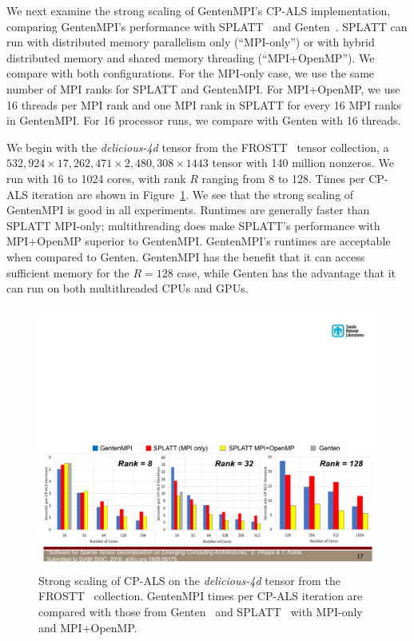 We next examine the strong scaling of GentenMPI's CP-ALS implementation,
comparing GentenMPI's performance with SPLATT~\cite{SK16} and 
Genten~\cite{PK19}.
SPLATT can run with distributed memory parallelism only (``MPI-only'') or
with hybrid distributed memory and shared memory threading (``MPI+OpenMP'').
We compare with both configurations.  
For the MPI-only case, we use the same number of 
MPI ranks for SPLATT and GentenMPI.  For MPI+OpenMP, we use 16 threads per 
MPI rank and one MPI rank in SPLATT for every 16 MPI ranks in GentenMPI.
For 16 processor runs, we compare with Genten with 16 threads.

We begin with the \emph{delicious-4d} tensor from the FROSTT~\cite{FROSTT} 
tensor collection,
a $532,924 \times 17,262,471 \times 2,480,308 \times 1443$ tensor with 140 million
nonzeros.
We run with 16 to 1024 cores, with rank $R$ ranging from 8 to 128.
Times per CP-ALS iteration are shown in Figure~\ref{fig:cpals_delicious}.
We see that the strong scaling of GentenMPI is good in all experiments.
Runtimes are generally faster than SPLATT MPI-only; multithreading does
make SPLATT's performance with MPI+OpenMP superior to GentenMPI.
GentenMPI's runtimes are acceptable when compared to Genten.  GentenMPI
has the benefit that it can access sufficient memory for the $R=128$ case,
while Genten has the advantage that it can run on both multithreaded CPUs and 
GPUs.

\begin{figure}[ht]
   \centering
   \includegraphics[keepaspectratio=true, width=6in]{figs/cpals_delicious}
   \caption[Strong scaling of CP-ALS on \emph{delicious-4d} tensor]{Strong scaling of CP-ALS on the \emph{delicious-4d} tensor from the FROSTT~\cite{FROSTT} collection.  GentenMPI times per CP-ALS iteration are compared
with those from Genten~\cite{PK19} and SPLATT~\cite{SK16} with MPI-only and MPI+OpenMP.}
   \label{fig:cpals_delicious}
\end{figure}



